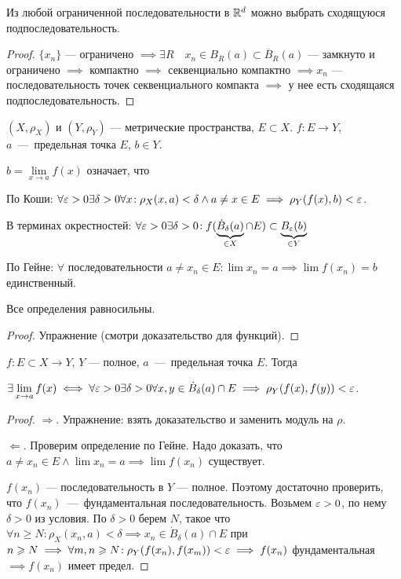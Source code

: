 \begin{theorem}
    Из любой ограниченной последовательности в $\mathbb{R}^d$ можно выбрать сходящуюся подпоследовательность.
\end{theorem}
\begin{proof}
    $\{x_n\}$ --- ограничено $\implies \exists R\quad x_n \in B_R(a) \subset \overline{B}_R(a)$ --- замкнуто и ограничено $\implies$ компактно  $\implies$ секвенциально компактно $\implies x_n$ --- последовательность точек секвенциального компакта  $\implies$ у нее есть сходящаяся подпоследовательность.
\end{proof}
\begin{definition}
    $(X, \rho_X)$ и  $(Y, \rho_Y)$ --- метрические пространства, $E \subset X$.  $f\!: E \to Y$, \\$a$~---~предельная точка  $E$,  $b \in Y$.

     $b = \lim\limits_{x \to a} f(x)$ означает, что

     По Коши:  $\forall \varepsilon > 0 \exists \delta > 0 \forall x\!: \rho_X(x,a) < \delta \land a \neq x \in E \implies \rho_Y(f(x), b) < \varepsilon$.

     В терминах окрестностей: $\forall \varepsilon > 0 \exists \delta > 0\!: f(\underbrace{\dot{B}_{\delta}(a)}_{\in X} \cap E) \subset \underbrace{B_\varepsilon(b)}_{\in Y}$

     По Гейне: $\forall$ последовательности  $a \neq x_n \in E\!: \lim x_n = a \implies \lim f(x_n) = b$ единственный.
\end{definition}
\begin{theorem}
    Все определения равносильны. 
\end{theorem}
\begin{proof}
    Упражнение (смотри доказательство для функций).
\end{proof}
\begin{theorem}
    $f\!:E \subset X \to Y$,  $Y$ --- полное,  $a$~---~предельная точка  $E$. Тогда

     $\exists \lim\limits_{x \to a} f(x) \iff \forall \varepsilon > 0 \exists \delta > 0 \forall x, y \in \dot{B}_{\delta}(a) \cap E \implies \rho_Y(f(x), f(y)) < \varepsilon$.
\end{theorem}
\begin{proof}
    $\Rightarrow$. Упражнение: взять доказательство и заменить модуль на  $\rho$.

     $\Leftarrow$. Проверим определение по Гейне. Надо доказать, что  $a \neq x_n \in E \land \lim x_n = a \implies \lim f(x_n)$ существует.

      $f(x_n)$ --- последовательность в  $Y$ --- полное. Поэтому достаточно проверить, что  $f(x_n)$~---~фундаментальная последовательность. Возьмем  $\varepsilon > 0$, по нему  $\delta > 0$ из условия. По  $\delta > 0$ берем  $N$, такое что  $\forall n \ge N\!: \rho_X(x_n, a) < \delta \implies x_n \in \dot{B}_\delta(a)\cap E$ при $n \geqslant N \implies \forall m, n \geqslant N\!: \rho_Y(f(x_n), f(x_m)) < \varepsilon \implies f(x_n)$ фундаментальная $\implies f(x_n)$ имеет предел.
\end{proof}

